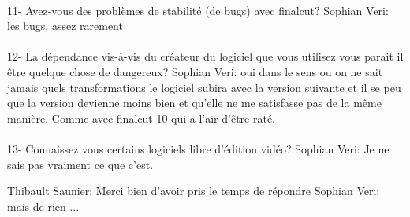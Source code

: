         \paragraph{}
          11- Avez-vous des problèmes de stabilité (de bugs) avec finalcut?
              Sophian Veri: les bugs, assez rarement

        \paragraph{}
          12- La dépendance vis-à-vis du créateur du logiciel que vous utilisez
                vous parait il être quelque chose de dangereux?
              Sophian Veri: oui dans le sens ou on ne sait jamais quels transformations le
              logiciel subira avec la version suivante et il se peu que la version devienne
              moins bien et qu'elle ne me satisfasse pas de la même manière. Comme avec
              finalcut 10 qui a l'air d'être raté.

        \paragraph{}
          13- Connaissez vous certains logiciels libre d'édition vidéo?
              Sophian Veri: Je ne sais pas vraiment ce que c'est.

          Thibault Saunier: Merci bien d'avoir pris le temps de répondre
          Sophian Veri: mais de rien
          ...
